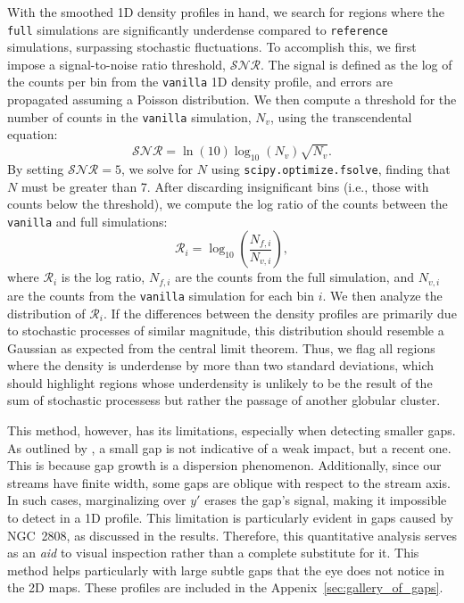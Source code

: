 \documentclass[draft]{aa}
\begin{document}
\begin{appendix}
    With the smoothed 1D density profiles in hand, we search for regions where the \texttt{full} simulations are significantly underdense compared to \texttt{reference} simulations, surpassing stochastic fluctuations. To accomplish this, we first impose a signal-to-noise ratio threshold, $\mathcal{SNR}$. The signal is defined as the log of the counts per bin from the \texttt{vanilla} 1D density profile, and errors are propagated assuming a Poisson distribution. We then compute a threshold for the number of counts in the \texttt{vanilla} simulation, $N_v$, using the transcendental equation:
    \begin{equation}
        \mathcal{SNR} = \ln(10) \log_{10}\left(N_v\right) \sqrt{N_v}.
      \end{equation} \label{eq:density_threshold}
    By setting $\mathcal{SNR} = 5$, we solve for $N$ using \texttt{scipy.optimize.fsolve}, finding that $N$ must be greater than 7. After discarding insignificant bins (i.e., those with counts below the threshold), we compute the log ratio of the counts between the \texttt{vanilla} and full simulations:
    \begin{equation}
        \mathcal{R}_i = \log_{10}\left(\frac{N_{f,i}}{N_{v,i}}\right),
      \end{equation}
    where $\mathcal{R}_i$ is the log ratio, $N_{f,i}$ are the counts from the full simulation, and $N_{v,i}$ are the counts from the \texttt{vanilla} simulation for each bin $i$. We then analyze the distribution of $\mathcal{R}_i$. If the differences between the density profiles are primarily due to stochastic processes of similar magnitude, this distribution should resemble a Gaussian as expected from the central limit theorem. Thus, we flag all regions where the density is underdense by more than two standard deviations, which should highlight regions whose underdensity is unlikely to be the result of the sum of stochastic processess but rather the passage of another globular cluster. 

    This method, however, has its limitations, especially when detecting smaller gaps. As outlined by \citet{2015MNRAS.450.1136E}, a small gap is not indicative of a weak impact, but a recent one. This is because gap growth is a dispersion phenomenon. Additionally, since our streams have finite width, some gaps are oblique with respect to the stream axis. In such cases, marginalizing over $y'$ erases the gap's signal, making it impossible to detect in a 1D profile. This limitation is particularly evident in gaps caused by NGC~2808, as discussed in the results. Therefore, this quantitative analysis serves as an \textit{aid} to visual inspection rather than a complete substitute for it. This method helps particularly with large subtle gaps that the eye does not notice in the 2D maps. These profiles are included in the Appenix~\ref{sec:gallery_of_gaps}.



\end{appendix}
\end{document}
